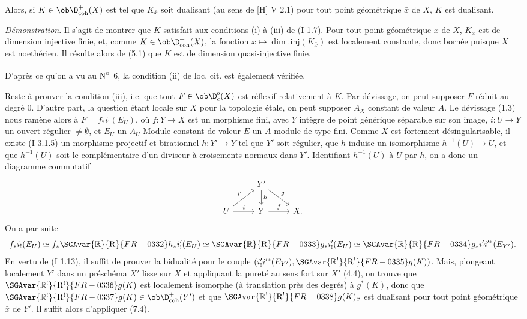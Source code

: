 Alors, si $K\in\ob\D^{+}_{\mathrm{coh}}(X)$ est tel que $K_{\bar{x}}$ soit dualisant (au sens de [H] V 2.1) pour tout point géométrique $\bar{x}$ de $X$, $K$ est dualisant.

\emph{Démonstration}. Il s'agit de montrer que $K$ satisfait aux conditions (i) à (iii) de (I 1.7). Pour tout point géométrique $\bar{x}$ de $X$, $K_{\bar{x}}$ est de
dimension injective finie, et, comme $K\in\ob\D^{+}_{\mathrm{coh}}(X)$, la fonction $x\mapsto \dim.\mathrm{inj}(K_{\bar{x}})$ est localement constante, donc bornée puisque $X$ est noethérien. Il résulte alors de (5.1) que $K$ est de dimension quasi-injective finie.

D'après ce qu'on a vu au N\textsuperscript{o}~6, la condition (ii) de loc. cit. est également vérifiée.

Reste à prouver la condition (iii), i.e. que tout $F\in\ob\D_c^b(X)$ est réflexif relativement à $K$. Par dévissage, on peut supposer $F$ réduit au degré $0$. D'autre part, la question étant locale sur $X$ pour la topologie étale, on peut supposer $A_X$ constant de valeur $A$. Le dévissage (1.3) nous ramène alors à $F=f_*i_!(E_U)$, où $f:Y\to X$ est un morphisme fini, avec $Y$ intègre de point générique séparable sur son image, $i:U\to Y$ un ouvert régulier $\neq\emptyset$, et $E_U$ un $A_U$-Module constant de valeur $E$ un $A$-module de type fini. Comme $X$ est fortement désingularisable, il existe (I 3.1.5) un morphisme projectif et birationnel $h:Y'\to Y$ tel que $Y'$ soit régulier, que $h$ induise un isomorphisme $h^{-1}(U)\to U$, et que $h^{-1}(U)$ soit le complémentaire d'un diviseur à croisements normaux dans $Y'$. Identifiant $h^{-1}(U)$ à $U$ par $h$, on a donc un diagramme commutatif
\[
\begin{tikzcd}
& Y' \arrow[d,"h"] \arrow[dr,"g"] & \\
U \arrow[ur,"i'"] \arrow[r,"i"] & Y \arrow[r,"f"] & X.
\end{tikzcd}
\]
On a par suite
\[
        f_*i_!(E_U)\simeq f_*\SGAvar{\mathbb{R}}{\mathrm{R}}{FR-0332} h_* i'_!(E_U)\simeq \SGAvar{\mathbb{R}}{\mathrm{R}}{FR-0333} g_* i'_!(E_U)\simeq \SGAvar{\mathbb{R}}{\mathrm{R}}{FR-0334} g_* i'_! i'^*(E_{Y'}).
\]
En vertu de (I 1.13), il suffit de prouver la bidualité pour le couple 
$(i'_!i'^*(E_{Y'}),\SGAvar{\mathbb{R}^!}{\mathrm{R}^!}{FR-0335}g(K))$. Mais, plongeant localement $Y'$ dans un préschéma $X'$
lisse sur $X$ et appliquant la pureté au sens fort sur $X'$ (4.4), on trouve que $\SGAvar{\mathbb{R}^!}{\mathrm{R}^!}{FR-0336}g(K)$ est localement isomorphe (à translation près des degrés) à $g^*(K)$, donc que $\SGAvar{\mathbb{R}^!}{\mathrm{R}^!}{FR-0337}g(K)\in\ob\D^{+}_{\mathrm{coh}}(Y')$ et que $\SGAvar{\mathbb{R}^!}{\mathrm{R}^!}{FR-0338}g(K)_{\bar{x}}$ est dualisant pour tout point géométrique $\bar{x}$ de $Y'$. Il suffit alors d'appliquer (7.4).

